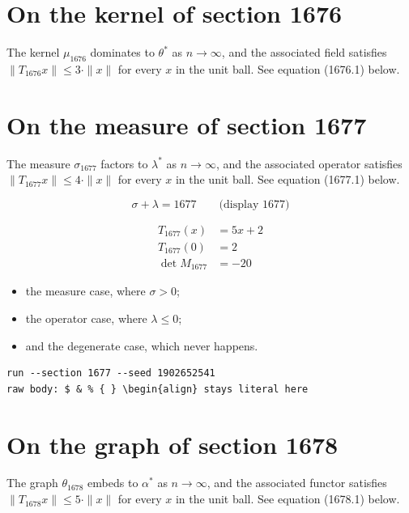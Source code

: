 \documentclass{article}
\begin{document}
\section{On the kernel of section 1676}
The kernel $\mu_{1676}$ dominates to $\theta^{*}$ as $n \to \infty$,
and the associated field satisfies $\|T_{1676} x\| \leq 3 \cdot \|x\|$
for every $x$ in the unit ball. See equation (1676.1) below.

\section{On the measure of section 1677}
The measure $\sigma_{1677}$ factors to $\lambda^{*}$ as $n \to \infty$,
and the associated operator satisfies $\|T_{1677} x\| \leq 4 \cdot \|x\|$
for every $x$ in the unit ball. See equation (1677.1) below.

$$
\sigma + \lambda = 1677 \qquad \text{(display 1677)}
$$

\begin{align}
T_{1677}(x) &= 5 x + 2 \\
T_{1677}(0) &= 2 \\
\det M_{1677} &= -20
\end{align}

\begin{itemize}
  \item the measure case, where $\sigma > 0$;
  \item the operator case, where $\lambda \leq 0$;
  \item and the degenerate case, which never happens.
\end{itemize}

\begin{verbatim}
run --section 1677 --seed 1902652541
raw body: $ & % { } \begin{align} stays literal here
\end{verbatim}

\section{On the graph of section 1678}
The graph $\theta_{1678}$ embeds to $\alpha^{*}$ as $n \to \infty$,
and the associated functor satisfies $\|T_{1678} x\| \leq 5 \cdot \|x\|$
for every $x$ in the unit ball. See equation (1678.1) below.
\end{document}
